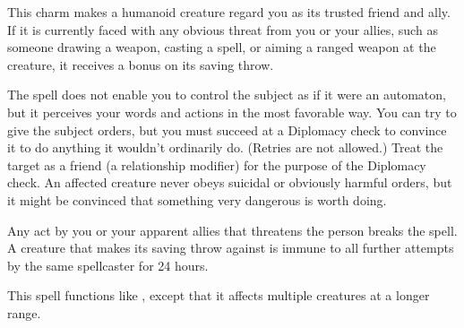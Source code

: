 \spellrng{\rngmed}
\spelldur{\durlong}
\begin{spelleffect}
  This charm makes a humanoid creature regard you as its trusted friend and ally. If it is currently faced with any obvious threat from you or your allies, such as someone drawing a weapon, casting a spell, or aiming a ranged weapon at the creature, it receives a  bonus on its saving throw.
  \par The spell does not enable you to control the subject as if it were an automaton, but it perceives your words and actions in the most favorable way. You can try to give the subject orders, but you must succeed at a Diplomacy check to convince it to do anything it wouldn't ordinarily do. (Retries are not allowed.) Treat the target as a friend (a  relationship modifier) for the purpose of the Diplomacy check. An affected creature never obeys suicidal or obviously harmful orders, but it might be convinced that something very dangerous is worth doing.
\end{spelleffect}
\begin{spellnotes}
  Any act by you or your apparent allies that threatens the  person breaks the spell. A creature that makes its saving throw against  is immune to all further attempts by the same spellcaster for 24 hours.
\end{spellnotes}

\begin{spelleffect}
  This spell functions like , except that it affects multiple creatures at a longer range.
\end{spelleffect}

